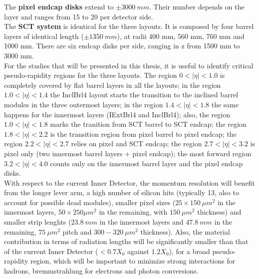 \documentclass[a4paper,twoside,12pt]{article}
\begin{document}
The \textbf{pixel endcap disks} extend to $\pm 3000\ mm$. Their 
number depends on the layer and ranges from 15 to 20 per detector side. \\

The \textbf{SCT system} is identical for the three layouts. It is composed by four barrel layers of identical length ($\pm 1350\ mm$), at radii 400 mm, 560 mm, 760 mm and 1000 mm. There
are six endcap disks per side, ranging in z from 1500 mm to 3000 mm. \\

For the studies that will be presented in this thesis, it is useful to identify critical pseudo-rapidity regions for the three layouts. The region $0 < |\eta| < 1.0$ is completely covered by
flat barrel layers in all the layouts; in the region $1.0 < |\eta| < 1.4$ the InclBrl4 layout starts the transition to the inclined barrel modules in the three outermost layers; in the
region $1.4 < |\eta| < 1.8$ the same happens for the innermost layers (IExtBrl4 and InclBrl4); also, the region $1.0 < |\eta| < 1.8$ marks the tranition from SCT barrel to SCT endcap; the region $1.8 < |\eta| < 2.2$ is the transition region from pixel barrel to pixel endcap; the region $2.2 < |\eta| < 2.7$ relies on pixel and SCT endcap; the region $2.7 < |\eta| < 3.2$  is pixel only (two innermost barrel layers + pixel endcap); the most forward region $3.2 < |\eta| < 4.0$ counts only on the innermost barrel layer and the pixel endcap disks.\\

With respect to the current Inner Detector, the momentum resolution will benefit from the longer lever arm, a high number of silicon hits (typically 13, also to account for
possible dead modules), smaller pixel sizes ($25 \times 150\ \mu m^2$ in the innermost layers, $50 \times 250 \mu m^{2}$ in the remaining, with $150\ \mu m^{2}$ thickness) and smaller strip lenghts ($23.8\ mm$ in the innermost
layers and $47.8\ mm$ in the remaining, $75\ \mu m^{2}$ pitch and $300 - 320 \ \mu m^{2}$ thickness)\cite{scoping}. Also, the material contribution in terms of radiation lengths 
will be significantly smaller than that of the current Inner Detector ($< 0.7 X_{0}$ against $1.2 X_{0}$), for a broad pseudo-rapidity region, which will be important to minimize
strong interactions for hadrons, bremmstrahlung for electrons and photon conversions. \\
\end{document}
